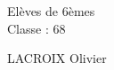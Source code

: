 \documentclass[a4paper,11pt,fleqn]{article}
\begin{document}
\begin{block}
\vspace{0.5cm}
\begin{minipage}{0.47\linewidth}
Elèves de 6èmes \\
Classe : 68
\end{minipage}
\hfill {}
\begin{minipage}{0.5\linewidth}
LACROIX Olivier
\end{minipage}
\hfill {}

\end{block}

\vfill


\vfill
\end{document}
